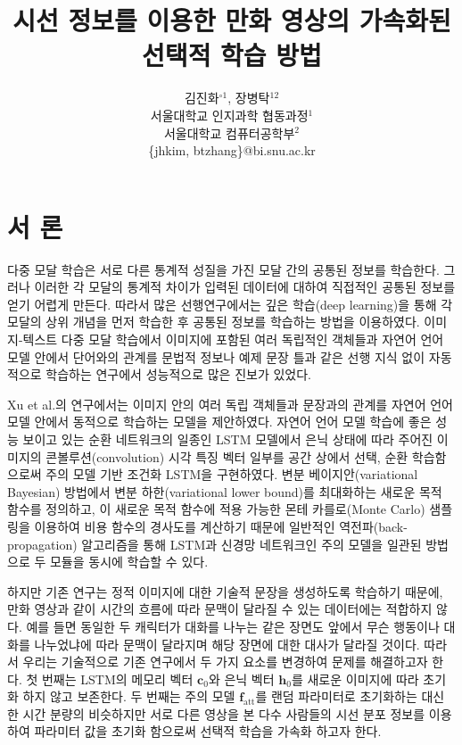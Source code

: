 \documentclass{kcc}
\title{시선 정보를 이용한 만화 영상의 가속화된 선택적 학습 방법}
\author{
김진화$^{\circ1}$, 장병탁$^{12}$\\
서울대학교 인지과학 협동과정$^{1}$\\
서울대학교 컴퓨터공학부$^{2}$\\
\{jhkim, btzhang\}@bi.snu.ac.kr
}
\newcommand{\vc}[0]{\mathbf{c}}
\newcommand{\vh}[0]{\mathbf{h}}
\begin{document}
\maketitle


\section{서 론}

다중 모달 학습은 서로 다른 통계적 성질을 가진 모달 간의 공통된 정보를 학습한다. 그러나 이러한 각 모달의 통계적 차이가 입력된 데이터에 대하여 직접적인 공통된 정보를 얻기 어렵게 만든다. 따라서 많은 선행연구에서는 깊은 학습(deep learning)을 통해 각 모달의 상위 개념을 먼저 학습한 후 공통된 정보를 학습하는 방법을 이용하였다\cite{Ngiam2011,NIPS2012_4683,Kiros2013,NIPS2014_5279}. 이미지-텍스트 다중 모달 학습에서 이미지에 포함된 여러 독립적인 객체들과 자연어 언어 모델 안에서 단어와의 관계를 문법적 정보나 예제 문장 틀과 같은 선행 지식 없이 자동적으로 학습하는 연구에서 성능적으로 많은 진보가 있었다\cite{Kiros2013,Yu2013,Karpathy}.

Xu et al.\cite{Xu2015}의 연구에서는 이미지 안의 여러 독립 객체들과 문장과의 관계를 자연어 언어 모델 안에서 동적으로 학습하는 모델을 제안하였다. 자연어 언어 모델 학습에 좋은 성능 보이고 있는 순환 네트워크의 일종인 LSTM 모델에서 은닉 상태에 따라 주어진 이미지의 콘볼루션(convolution) 시각 특징 벡터 일부를 공간 상에서 선택, 순환 학습함으로써 주의 모델 기반 조건화 LSTM을 구현하였다. 변분 베이지안(variational Bayesian) 방법에서 변분 하한(variational lower bound)를 최대화하는 새로운 목적 함수를 정의하고, 이 새로운 목적 함수에 적용 가능한 몬테 카를로(Monte Carlo) 샘플링을 이용하여 비용 함수의 경사도를 계산하기 때문에 일반적인 역전파(back-propagation) 알고리즘을 통해 LSTM과 신경망 네트워크인 주의 모델을 일관된 방법으로 두 모듈을 동시에 학습할 수 있다.

하지만 기존 연구는 정적 이미지에 대한 기술적 문장을 생성하도록 학습하기 때문에, 만화 영상과 같이 시간의 흐름에 따라 문맥이 달라질 수 있는 데이터에는 적합하지 않다. 예를 들면 동일한 두 캐릭터가 대화를 나누는 같은 장면도 앞에서 무슨 행동이나 대화를 나누었냐에 따라 문맥이 달라지며 해당 장면에 대한 대사가 달라질 것이다. 따라서 우리는 기술적으로 기존 연구에서 두 가지 요소를 변경하여 문제를 해결하고자 한다. 첫 번째는 LSTM의 메모리 벡터 $\vc_0$와 은닉 벡터 $\vh_0$를 새로운 이미지에 따라 초기화 하지 않고 보존한다. 두 번째는 주의 모델 $\mathbf{f}_{\text{att}}$를 랜덤 파라미터로 초기화하는 대신 한 시간 분량의 비슷하지만 서로 다른 영상을 본 다수 사람들의 시선 분포 정보를 이용하여 파라미터 값을 초기화 함으로써 선택적 학습을 가속화 하고자 한다.  
\end{document}
